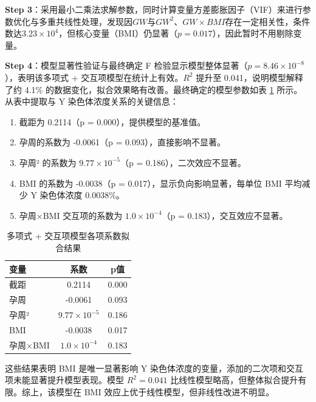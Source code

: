 \documentclass[withoutpreface,bwprint]{cumcmthesis} %
\begin{document}
\textbf{Step 3}：采用最小二乘法求解参数，同时计算变量方差膨胀因子（VIF）来进行参数优化与多重共线性处理，发现因$GW$与$GW^2$、$GW \times BMI$存在一定相关性，条件数达$3.23 \times 10^4$，但核心变量（BMI）仍显著（$p=0.017$），因此暂时不用剔除变量。

\textbf{Step 4}：模型显著性验证与最终确定
F 检验显示模型整体显著（$p=8.46 \times 10^{-8}$），表明该多项式 + 交互项模型在统计上有效。$R^2$ 提升至 0.041，说明模型解释了约 4.1\% 的数据变化，拟合效果略有改善。最终确定的模型参数如表 \ref{tab:多项式 + 交互项模型各项系数拟合结果} 所示。
从表中提取与 Y 染色体浓度关系的关键信息：
\begin{enumerate}
    \item 截距为 0.2114（p = 0.000），提供模型的基准值。
    \item 孕周的系数为 -0.0061（p = 0.093），直接影响不显著。
    \item 孕周² 的系数为 $9.77 \times 10^{-5}$（p = 0.186），二次效应不显著。
    \item BMI 的系数为 -0.0038（p = 0.017），显示负向影响显著，每单位 BMI 平均减少 Y 染色体浓度 0.0038\%。
    \item 孕周×BMI 交互项的系数为 $1.0 \times 10^{-4}$（p = 0.183），交互效应不显著。
\end{enumerate}

\begin{table}[H]
    \centering  %
    \caption{多项式 + 交互项模型各项系数拟合结果}  %
    \label{tab:多项式 + 交互项模型各项系数拟合结果}  %
    \begin{threeparttable}
        \begin{tabularx}{0.4\textwidth}{l c c }
            \toprule[1.5pt]
            \textbf{变量} & \textbf{系数} & \textbf{p值}\\ 
            \midrule[1pt]
            截距 & 0.2114 & 0.000  \\
            孕周 & -0.0061 & 0.093  \\
            孕周² & $9.77 \times 10^{-5}$ & 0.186  \\
            BMI & -0.0038 & 0.017  \\
            孕周×BMI & $1.0 \times 10^{-4}$ & 0.183  \\        \bottomrule[1.5pt]
    \end{tabularx}
\end{threeparttable}
\end{table} 

这些结果表明 BMI 是唯一显著影响 Y 染色体浓度的变量，添加的二次项和交互项未能显著提升模型表现。模型 $R^2 = 0.041$ 比线性模型略高，但整体拟合提升有限。综上，该模型在 BMI 效应上优于线性模型，但非线性改进不明显。
\end{document}
